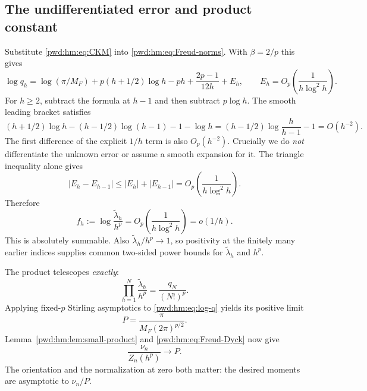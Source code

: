 \documentclass[11pt,letterpaper]{article}
\numberwithin{equation}{section}
\theoremstyle{remark}\newtheorem{remark}[theorem]{Remark}
\begin{document}
\subsection{The undifferentiated error and product constant}
Substitute \eqref{pwd:hm:eq:CKM} into \eqref{pwd:hm:eq:Freud-norms}. With $\beta=2/p$ this gives
\begin{equation}\label{pwd:hm:eq:log-q}
 \log q_h=\log(\pi/M_F)+p(h+1/2)\log h-ph
 +\frac{2p-1}{12h}+E_h,\qquad
 E_h=O_p\left(\frac1{h\log^2h}\right).
\end{equation}
For $h\ge2$, subtract the formula at $h-1$ and then subtract $p\log h$. The smooth leading bracket satisfies
\[
 (h+1/2)\log h-(h-1/2)\log(h-1)-1-\log h
 =(h-1/2)\log\frac h{h-1}-1=O(h^{-2}).
\]
The first difference of the explicit $1/h$ term is also $O_p(h^{-2})$. Crucially we do \emph{not} differentiate the unknown error or assume a smooth expansion for it. The triangle inequality alone gives
\[
 |E_h-E_{h-1}|\le|E_h|+|E_{h-1}|
 =O_p\left(\frac1{h\log^2h}\right).
\]
Therefore
\begin{equation}\label{pwd:hm:eq:Freud-small}
 f_h:=\log\frac{\widetilde\lambda_h}{h^p}
 =O_p\left(\frac1{h\log^2h}\right)=o(1/h).
\end{equation}
This is absolutely summable. Also $\widetilde\lambda_h/h^p\to1$, so positivity at the finitely many earlier indices supplies common two-sided power bounds for $\widetilde\lambda_h$ and $h^p$.

The product telescopes \emph{exactly}:
\begin{equation}\label{pwd:hm:eq:Freud-telescope}
 \prod_{h=1}^N\frac{\widetilde\lambda_h}{h^p}=\frac{q_N}{(N!)^p}.
\end{equation}
Applying fixed-$p$ Stirling asymptotics to \eqref{pwd:hm:eq:log-q} yields its positive limit
\begin{equation}\label{pwd:hm:eq:Freud-P}
 P=\frac\pi{M_F(2\pi)^{p/2}}.
\end{equation}
Lemma~\ref{pwd:hm:lem:small-product} and \eqref{pwd:hm:eq:Freud-Dyck} now give
\begin{equation}\label{pwd:hm:eq:Freud-transfer}
 \frac{\nu_n}{Z_n(h^p)}\longrightarrow P.
\end{equation}
The orientation and the normalization at zero both matter: the desired moments are asymptotic to $\nu_n/P$.
\end{document}
